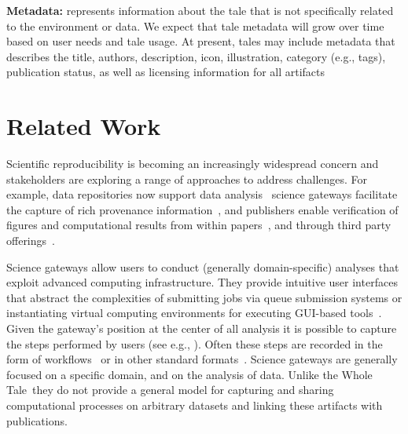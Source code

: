 \documentclass[review]{elsarticle}
\newcommand{\wt}{Whole\,Tale}
\begin{document}
\textbf{Metadata:} represents information about the tale that is
not specifically related to the environment or data. We expect
that tale metadata will grow over time based on user needs and 
tale usage.  At present, tales may include metadata that describes
the title, authors, description, icon, illustration, category (e.g., tags), publication status, as well as licensing information for all artifacts~\cite{stodden_legal_2009}


 
 
 
\section{Related Work}\label{sec:relatedwork}

Scientific reproducibility is becoming an increasingly widespread
concern and stakeholders are exploring a range of 
approaches to address challenges. For example, 
data repositories now support data analysis~\cite{SciServer,TerraRef} 
science gateways facilitate the capture of rich provenance
information~\cite{gesing15gateways},
and publishers enable verification of figures and computational 
results from within papers~\cite{shen14notebooks}, and through third party offerings~\cite{5872076, 10.1109/ICCV.2013.101}. 

Science gateways allow users to conduct (generally domain-specific) analyses that exploit
advanced computing infrastructure. They provide intuitive user interfaces that abstract
the complexities of submitting jobs via queue submission systems or
instantiating virtual computing environments for executing GUI-based tools~\cite{mclennan10hub}. Given the gateway's position at the
center of all analysis it is possible
to capture the steps performed by users (see e.g., \cite{DBLP:journals/corr/JamesWS14}). Often these steps
are recorded in the form of workflows~\cite{goecks10galaxy}
or in other standard formats~\cite{prov-dm}.
Science gateways are generally focused on a specific domain, and 
on the analysis of data. Unlike the \wt\ they do
not provide a general model for capturing and sharing computational processes 
on arbitrary datasets and linking these artifacts with publications.
\end{document}
